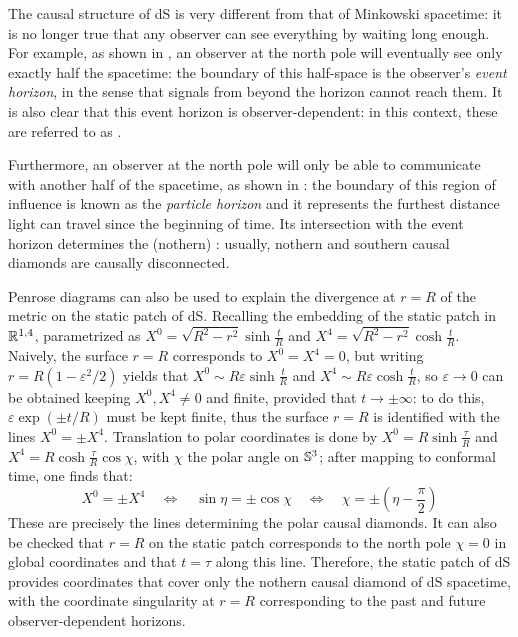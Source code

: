 The causal structure of dS is very different from that of Minkowski spacetime: it is no longer true that any observer can see everything by waiting long enough. For example, as shown in , an observer at the north pole will eventually see only exactly half the spacetime: the boundary of this half-space is the observer's \textit{event horizon}, in the sense that signals from beyond the horizon cannot reach them. It is also clear that this event horizon is observer-dependent: in this context, these are referred to as .

Furthermore, an observer at the north pole will only be able to communicate with another half of the spacetime, as shown in : the boundary of this region of influence is known as the \textit{particle horizon} and it represents the furthest distance light can travel since the beginning of time. Its intersection with the event horizon determines the (nothern) : usually, nothern and southern causal diamonds are causally disconnected.

Penrose diagrams can also be used to explain the divergence at $ r = R $ of the metric  on the static patch of dS. Recalling the embedding of the static patch in $ \mathbb{R}^{1,4} $, parametrized as $ X^0 = \sqrt{R^2 - r^2} \sinh \frac{t}{R} $ and $ X^4 = \sqrt{R^2 - r^2} \cosh \frac{t}{R} $. Naively, the surface $ r = R $ corresponds to $ X^0 = X^4 = 0 $, but writing $ r = R ( 1 - \varepsilon^2 / 2) $ yields that $ X^0 \sim R \varepsilon \sinh \frac{t}{R} $ and $ X^4 \sim R \varepsilon \cosh \frac{t}{R} $, so $ \varepsilon \rightarrow 0 $ can be obtained keeping $ X^0, X^4 \neq 0 $ and finite, provided that $ t \rightarrow \pm \infty $: to do this, $ \varepsilon \exp (\pm t / R) $ must be kept finite, thus the surface $ r = R $ is identified with the lines $ X^0 = \pm X^4 $. Translation to polar coordinates is done by $ X^0 = R \sinh \frac{\tau}{R} $ and $ X^4 = R \cosh \frac{\tau}{R} \cos \chi $, with $ \chi $ the polar angle on $ \mathbb{S}^{3} $; after mapping to conformal time, one finds that:
\begin{equation*}
  X^0 = \pm X^4
  \quad \iff \quad
  \sin \eta = \pm \cos \chi
  \quad \iff \quad
  \chi = \pm \left( \eta - \frac{\pi}{2} \right)
\end{equation*}
These are precisely the lines determining the polar causal diamonds. It can also be checked that $ r = R $ on the static patch corresponds to the north pole $ \chi = 0 $ in global coordinates and that $ t = \tau $ along this line. Therefore, the static patch of dS provides coordinates that cover only the nothern causal diamond of dS spacetime, with the coordinate singularity at $ r = R $ corresponding to the past and future observer-dependent horizons.

